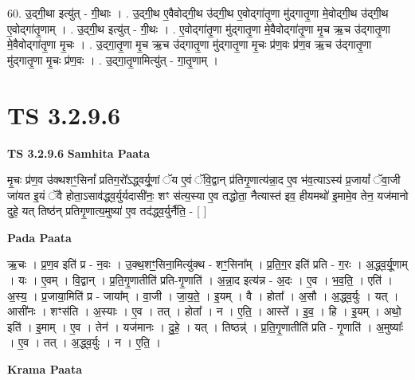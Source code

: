 \documentclass[17pt]{extarticle}
\begin{document}
60. उ॒द्‍गी॒था इत्यु॑त् - गी॒थाः । . उ॒द्‍गी॒थ ए॒वैवोद्‍गी॒थ उ॑द्‍गी॒थ ए॒वोद्‍गा॑तृ॒णा मु॑द्‍गातृ॒णा मे॒वोद्‍गी॒थ उ॑द्‍गी॒थ ए॒वोद्‍गा॑तृ॒णाम् । . उ॒द्‍गी॒थ इत्यु॑त् - गी॒थः । . ए॒वोद्‍गा॑तृ॒णा मु॑द्‍गातृ॒णा मे॒वैवोद्‍गा॑तृ॒णा मृ॒च ऋ॒च उ॑द्‍गातृ॒णा मे॒वैवोद्‍गा॑तृ॒णा मृ॒चः । . उ॒द्‍गा॒तृ॒णा मृ॒च ऋ॒च उ॑द्‍गातृ॒णा मु॑द्‍गातृ॒णा मृ॒चः प्र॑ण॒वः प्र॑ण॒व ऋ॒च उ॑द्‍गातृ॒णा मु॑द्‍गातृ॒णा मृ॒चः प्र॑ण॒वः । . उ॒द्‍गा॒तृ॒णामित्यु॑त् - गा॒तृ॒णाम् । \newline
\pagebreak
{}

\section{ TS 3.2.9.6 }

\textbf{TS 3.2.9.6 } \newline
\textbf{Samhita Paata} \newline

मृ॒चः प्र॑ण॒व उ॑क्थशꣳ॒॒सिनां᳚ प्रतिग॒रो᳚ऽद्ध्वर्यू॒णां ॅय ए॒वं ॅवि॒द्वान् प्र॑तिगृ॒णात्य॑न्ना॒द ए॒व भ॑व॒त्याऽस्य॑ प्र॒जायां᳚ ॅवा॒जी जा॑यत इ॒यं ॅवै होता॒ऽसाव॑द्ध्व॒र्युर्यदासी॑नः॒ शꣳ स॑त्य॒स्या ए॒व तद्धोता॒ नैत्यास्त॑ इव॒ हीयमथो॑ इ॒मामे॒व तेन॒ यज॑मानो दुहे॒ यत् तिष्ठ॑न् प्रतिगृ॒णात्य॒मुष्या॑ ए॒व तद॑द्ध्व॒र्युर्नैति॒ - [  ] \newline

\textbf{Pada Paata} \newline

ऋ॒चः । प्र॒ण॒व इति॑ प्र - न॒वः । उ॒क्थ॒शꣳ॒॒सिना॒मित्यु॑क्थ - शꣳ॒॒सिना᳚म् । प्र॒ति॒ग॒र इति॑ प्रति - ग॒रः । अ॒द्ध्व॒र्यू॒णाम् । यः । ए॒वम् । वि॒द्वान् । प्र॒ति॒गृ॒णातीति॑ प्रति-गृ॒णाति॑ । अ॒न्ना॒द इत्य॑न्न - अ॒दः । ए॒व । भ॒व॒ति॒ । एति॑ । अ॒स्य॒ । प्र॒जाया॒मिति॑ प्र - जाया᳚म् । वा॒जी । जा॒य॒ते॒ । इ॒यम् । वै । होता᳚ । अ॒सौ । अ॒द्ध्व॒र्युः । यत् । आसी॑नः । शꣳस॑ति । अ॒स्याः । ए॒व । तत् । होता᳚ । न । ए॒ति॒ । आस्ते᳚ । इ॒व॒ । हि । इ॒यम् । अथो॒ इति॑ । इ॒माम् । ए॒व । तेन॑ । यज॑मानः । दु॒हे॒ । यत् । तिष्ठन्न्॑ । प्र॒ति॒गृ॒णातीति॑ प्रति - गृ॒णाति॑ । अ॒मुष्याः᳚ । ए॒व । तत् । अ॒द्ध्व॒र्युः । न । ए॒ति॒ ।  \newline


\textbf{Krama Paata} \newline
\end{document}
